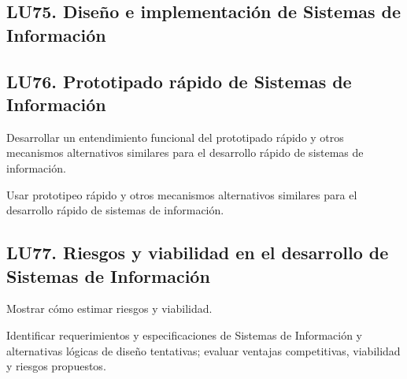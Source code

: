 \subsection{LU75. Diseño e implementación de Sistemas de Información}\label{sec:LU75}
\subsection{LU76. Prototipado rápido de Sistemas de Información}\label{sec:LU76}
\begin{LearningUnit}
\begin{LUGoal}
\item Desarrollar un entendimiento funcional del prototipado rápido y otros mecanismos alternativos similares para el desarrollo rápido de sistemas de información.
\end{LUGoal}

\begin{LUObjective}
\item Usar prototipeo rápido y otros mecanismos alternativos similares para el desarrollo rápido de sistemas de información.
\end{LUObjective}
\end{LearningUnit}

\subsection{LU77. Riesgos y viabilidad en el desarrollo de Sistemas de Información}\label{sec:LU77}
\begin{LearningUnit}
\begin{LUGoal}
\item Mostrar cómo estimar riesgos y viabilidad.
\end{LUGoal}

\begin{LUObjective}
\item Identificar requerimientos y especificaciones de Sistemas de Información y alternativas lógicas de diseño tentativas; evaluar ventajas competitivas, viabilidad y riesgos propuestos.
\end{LUObjective}
\end{LearningUnit}

